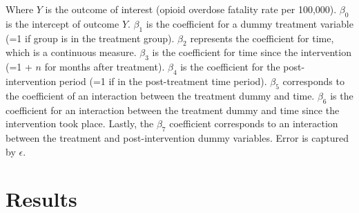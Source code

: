 Where \(Y\) is the outcome of interest (opioid overdose fatality rate per 100,000). \(\beta_0\) is the intercept of outcome \(Y\). \(\beta_1\) is the coefficient for a dummy treatment variable (=1 if group is in the treatment group). \(\beta_2\) represents the coefficient for time, which is a continuous measure. \(\beta_3\) is the coefficient for time since the intervention (=1 + \(n\) for months after treatment). \(\beta_4\) is the coefficient for the post-intervention period (=1 if in the post-treatment time period).  \(\beta_5\) corresponds to the coefficient of an interaction between the treatment dummy and time. \(\beta_6\) is the coefficient for an interaction between the treatment dummy and time since the intervention took place. Lastly, the \(\beta_7\) coefficient corresponds to an interaction between the treatment and post-intervention dummy variables. Error is captured by \(\epsilon\).

\section{Results}
